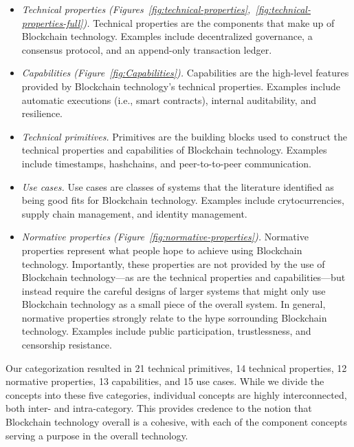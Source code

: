 \begin{itemize}
	\item \emph{Technical properties (Figures~\ref{fig:technical-properties},~\ref{fig:technical-properties-full}).}
	Technical properties are the components that make up of Blockchain technology. Examples include decentralized governance, a consensus protocol, and an append-only transaction ledger.
	
	\item \emph{Capabilities (Figure~\ref{fig:Capabilities}).}
	Capabilities are the high-level features provided by Blockchain technology's technical properties. Examples include automatic executions (i.e., smart contracts), internal auditability, and resilience.
	
	\item \emph{Technical primitives.}
	Primitives are the building blocks used to construct the technical properties and capabilities of Blockchain technology. Examples include timestamps, hashchains, and peer-to-to-peer communication.
	
	\item \emph{Use cases.}
	Use cases are classes of systems that the literature identified as being good fits for Blockchain technology. Examples include crytocurrencies, supply chain management, and identity management.
	
	\item \emph{Normative properties (Figure~\ref{fig:normative-properties}).}
	Normative properties represent what people hope to achieve using Blockchain technology. 
	Importantly, these properties are not provided by the use of Blockchain technology---as are the technical properties and capabilities---but instead require the careful designs of larger systems that might only use Blockchain technology as a small piece of the overall system.
	In general, normative properties strongly relate to the hype sorrounding Blockchain technology.
	Examples include public participation, trustlessness, and censorship resistance.
		
\end{itemize}

Our categorization resulted in 21 technical primitives, 14 technical properties, 12 normative properties, 13 capabilities, and 15 use cases.
While we divide the concepts into these five categories, individual concepts are highly interconnected, both inter- and intra-category. 
This provides credence to the notion that Blockchain technology overall is a cohesive, with each of the component concepts serving a purpose in the overall technology.

